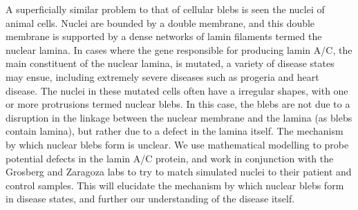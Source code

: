 A superficially similar problem to that of cellular blebs is seen the nuclei of animal cells. Nuclei are bounded by a double membrane, and this double membrane is supported by a dense networks of lamin filaments termed the nuclear lamina. In cases where the gene responsible for producing lamin A/C, the main constituent of the nuclear lamina, is mutated, a  variety of disease states may ensue, including extremely severe diseases such as progeria and heart disease. The nuclei in these mutated cells often have a irregular shapes, with one or more protrusions termed nuclear blebs. In this case, the blebs are not due to a disruption in the linkage between the nuclear membrane and the lamina  (as blebs contain lamina), but rather due to a defect in the lamina itself. The mechanism by which nuclear blebs form is unclear. We use mathematical modelling to probe potential defects in the lamin A/C protein, and work in conjunction with the Grosberg and Zaragoza labs to try to match simulated nuclei to their patient and control samples. This will elucidate the mechanism by which nuclear blebs form in disease states, and further our understanding of the disease itself. 






  